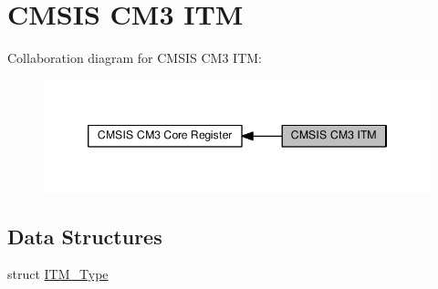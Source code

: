 \hypertarget{group__CMSIS__CM3__ITM}{}\section{C\+M\+S\+IS C\+M3 I\+TM}
\label{group__CMSIS__CM3__ITM}
Collaboration diagram for C\+M\+S\+IS C\+M3 I\+TM\+:\nopagebreak
\begin{figure}[H]
\begin{center}
\leavevmode
\includegraphics[width=346pt]{d7/db9/group__CMSIS__CM3__ITM}
\end{center}
\end{figure}
\subsection*{Data Structures}
\begin{DoxyCompactItemize}
\item 
struct \hyperlink{structITM__Type}{I\+T\+M\+\_\+\+Type}
\end{DoxyCompactItemize}
